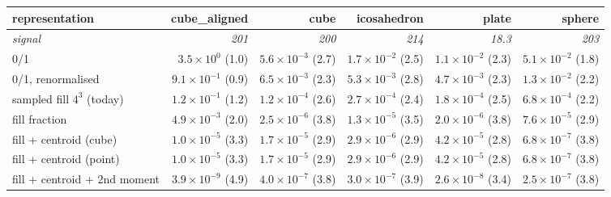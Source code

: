 \begin{tabular}{lrrrrr}
\toprule
representation & cube\_aligned & cube & icosahedron & plate & sphere \\
\midrule
\textit{signal} & \textit{201} & \textit{200} & \textit{214} & \textit{18.3} & \textit{203} \\
0/1 & $3.5\times10^{0}$ (1.0) & $5.6\times10^{-3}$ (2.7) & $1.7\times10^{-2}$ (2.5) & $1.1\times10^{-2}$ (2.3) & $5.1\times10^{-2}$ (1.8) \\
0/1, renormalised & $9.1\times10^{-1}$ (0.9) & $6.5\times10^{-3}$ (2.3) & $5.3\times10^{-3}$ (2.8) & $4.7\times10^{-3}$ (2.3) & $1.3\times10^{-2}$ (2.2) \\
sampled fill $4^3$ (today) & $1.2\times10^{-1}$ (1.2) & $1.2\times10^{-4}$ (2.6) & $2.7\times10^{-4}$ (2.4) & $1.8\times10^{-4}$ (2.5) & $6.8\times10^{-4}$ (2.2) \\
fill fraction & $4.9\times10^{-3}$ (2.0) & $2.5\times10^{-6}$ (3.8) & $1.3\times10^{-5}$ (3.5) & $2.0\times10^{-6}$ (3.8) & $7.6\times10^{-5}$ (2.9) \\
fill + centroid (cube) & $1.0\times10^{-5}$ (3.3) & $1.7\times10^{-5}$ (2.9) & $2.9\times10^{-6}$ (2.9) & $4.2\times10^{-5}$ (2.8) & $6.8\times10^{-7}$ (3.8) \\
fill + centroid (point) & $1.0\times10^{-5}$ (3.3) & $1.7\times10^{-5}$ (2.9) & $2.9\times10^{-6}$ (2.9) & $4.2\times10^{-5}$ (2.8) & $6.8\times10^{-7}$ (3.8) \\
fill + centroid + 2nd moment & $3.9\times10^{-9}$ (4.9) & $4.0\times10^{-7}$ (3.8) & $3.0\times10^{-7}$ (3.9) & $2.6\times10^{-8}$ (3.4) & $2.5\times10^{-7}$ (3.8) \\
\bottomrule
\end{tabular}
